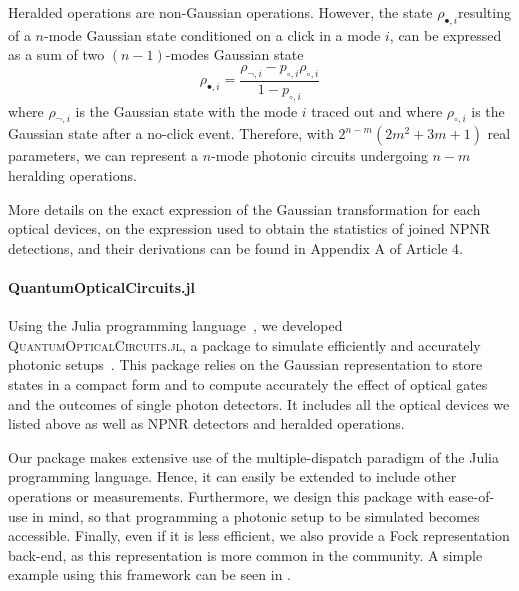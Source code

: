 Heralded operations are non-Gaussian operations.
However, the state $\rho_{\bullet,i}$resulting of a $n$-mode Gaussian state conditioned on a click in a mode $i$, can be expressed as a sum of two $(n-1)$-modes Gaussian state
\begin{equation}
    \rho_{\bullet,i} = \frac{\rho_{\lnot,i} - p_{\circ,i} \rho_{\circ,i}}{1 - p_{\circ,i}}
\end{equation}
where $\rho_{\lnot,i}$ is the Gaussian state with the mode $i$ traced out and where $\rho_{\circ,i}$ is the Gaussian state after a no-click event.
Therefore, with $2^{n-m}(2m^2+3m+1)$ real parameters, we can represent a $n$-mode photonic circuits undergoing $n-m$ heralding operations.

More details on the exact expression of the Gaussian transformation for each optical devices, on the expression used to obtain the statistics of joined NPNR detections, and their derivations can be found in Appendix A of Article 4.

\paragraph{QuantumOpticalCircuits.jl}

Using the Julia programming language~\cite{Bezanson2017}, we developed \textsc{QuantumOpticalCircuits.jl}, a package to simulate efficiently and accurately photonic setups~\cite{Valcarce2021}.
This package relies on the Gaussian representation to store states in a compact form and to compute accurately the effect of optical gates and the outcomes of single photon detectors.
It includes all the optical devices we listed above as well as NPNR detectors and heralded operations.

Our package makes extensive use of the multiple-dispatch paradigm of the Julia programming language.
Hence, it can easily be extended to include other operations or measurements.
Furthermore, we design this package with ease-of-use in mind, so that programming a photonic setup to be simulated becomes accessible.
Finally, even if it is less efficient, we also provide a Fock representation back-end, as this representation is more common in the community.
A simple example using this framework can be seen in .

